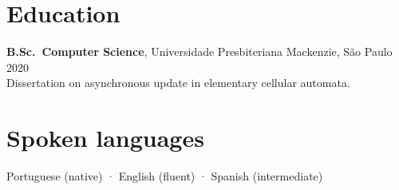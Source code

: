 \documentclass[10pt,a4paper]{article}
\begin{document}
\section{Education}
\noindent\textbf{B.Sc.\ Computer Science}, Universidade Presbiteriana Mackenzie, São Paulo \hfill 2020\\
{\small\color{muted}Dissertation on asynchronous update in elementary cellular automata.}

\section{Spoken languages}
Portuguese (native) · English (fluent) · Spanish (intermediate)
\end{document}
